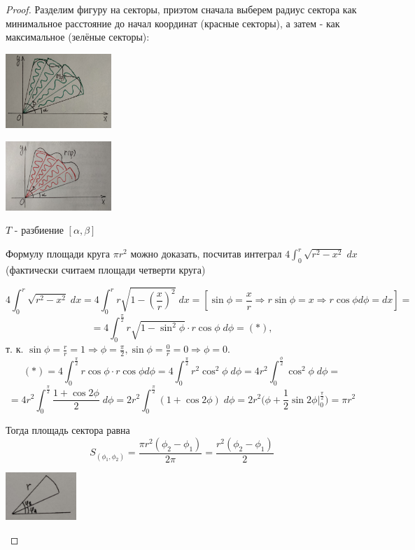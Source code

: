     \begin{proof}
    	Разделим фигуру на секторы, приэтом сначала выберем радиус сектора как минимальное расстояние до начал координат (красные секторы), а затем - как максимальное (зелёные секторы):
   	
   		\begin{center}
   			\includegraphics[width=0.3\textwidth]{img/lecture33/max_sectors}
   		\end{center}
   		\begin{center}
   		    \includegraphics[width=0.3\textwidth]{img/lecture33/min_sectors}
   		\end{center}
   		
   		$T$ - разбиение $[\alpha, \beta]$
   		
   		Формулу площади круга $\pi r^2$ можно доказать, посчитав интеграл $4 \int_0^r \sqrt{r^2 - x^2} \; dx$ (фактически считаем площади четверти круга)
   		
   		\[ 4 \int_0^r \sqrt{r^2 - x^2} \; dx = 4 \int_0^r r\sqrt{1 - (\frac{x}{r})^2} \; dx = [\sin{\phi} = \frac{x}{r} \Rightarrow r\sin{\phi} = x \Rightarrow r\cos{\phi} d\phi = dx] = \] 
   		\[ = 4 \int_0^{\frac{\pi}{2}} r\sqrt{1 - \sin^2{\phi}} \cdot r \cos{\phi} \; d\phi = (*), \]
   		т. к. $\sin{\phi} = \frac{r}{r} = 1 \Rightarrow \phi = \frac{\pi}{2}, \sin{\phi} = \frac{0}{r} = 0 \Rightarrow \phi = 0.$
    	\[ (*) = 4 \int_0^{\frac{\pi}{2}} r \cos{\phi} \cdot r \cos{\phi} d\phi = 4 \int_0^{\frac{\pi}{2}} r^2 \cos^2{\phi} \; d\phi = 4r^2 \int_0^{\frac{\phi}{2}} \cos^2{\phi} \; d\phi = \] 
    	\[ = 4 r^2 \int_0^{\frac{\pi}{2}} \frac{1 + \cos{2\phi}}{2} \; d\phi = 2r^2 \int_0^{\frac{\pi}{2}} (1 + \cos{2\phi}) \; d\phi = 2r^2 \bigg(\phi + \frac{1}{2} \sin{2\phi} \bigg|_0^{\frac{\pi}{2}}\bigg) = \pi r^2 \]
    	
    	Тогда площадь сектора равна
    	\[ S_{(\phi_1, \phi_2)} = \frac{\pi r^2 (\phi_2 - \phi_1)}{2\pi} = \frac{r^2 (\phi_2 - \phi_1)}{2} \]
    	\begin{center}
    		\includegraphics[width=0.2\textwidth]{img/lecture33/sector}
    	\end{center}
    	

\end{proof}
